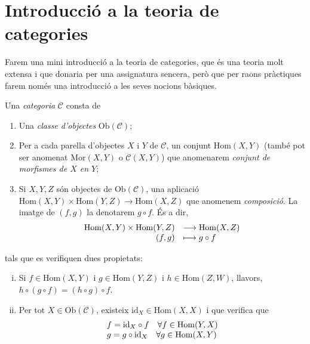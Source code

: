 \documentclass[../main.tex]{subfiles}
\begin{document}
\chapter{Introducció a la teoria de categories}

Farem una mini introducció a la teoria de categories, que és una teoria molt extensa i que donaria per una assignatura sencera, però que per raons pràctiques farem només una introducció a les seves nocions bàsiques.

\begin{defi}
[Categoria] Una \textit{categoria} $\mathcal{C}$ consta de
\begin{enumerate}[1)]
    \item Una \textit{classe d'objectes} $\mathrm{Ob}(\mathcal{C})$;
    \item Per a cada parella d'objectes $X$ i $Y$ de $\mathcal{C}$, un conjunt $\mathrm{Hom}(X,Y)$ (també pot ser anomenat $\mathrm{Mor}(X,Y)$ o $\mathcal{C}(X,Y)$) que anomenarem \textit{conjunt de morfismes de $X$ en $Y$};
    \item Si $X,Y,Z$ són objectes de $\mathrm{Ob}(\mathcal{C})$, una aplicació $\mathrm{Hom}(X,Y)\times \mathrm{Hom}(Y,Z)\rightarrow \mathrm{Hom}(X,Z)$ que anomenem \textit{composició}. La imatge de $(f,g)$ la denotarem $g\circ f$. És a dir,
    \begin{equation}
        \notag
        \begin{array}{rl}
            \mathrm{Hom}(X,Y)\times \mathrm{Hom}(Y,Z) & \longrightarrow \mathrm{Hom}(X,Z)\\
            (f,g) & \longmapsto g\circ f
        \end{array}
    \end{equation}
\end{enumerate}
tals que es verifiquen dues propietats:
\begin{enumerate}[(i)]
    \item Si $f\in \mathrm{Hom}(X,Y)$ i $g\in\mathrm{Hom}(Y,Z)$ i $h\in \mathrm{Hom}(Z,W)$, llavors, $h\circ(g\circ f) = (h\circ g)\circ f$.
    \item Per tot $X\in\mathrm{Ob}(\mathcal{C})$, existeix $\mathrm{id}_X\in\mathrm{Hom}(X,X)$ i que verifica que
    \begin{equation}
        \notag
        \begin{array}{ll}
            f = \mathrm{id}_X\circ f\quad \forall f\in\mathrm{Hom}(Y,X)\\
            g = g\circ \mathrm{id}_X\quad \forall g\in\mathrm{Hom}(X,Y)
        \end{array}
    \end{equation}
\end{enumerate}
\end{defi}
\end{document}
